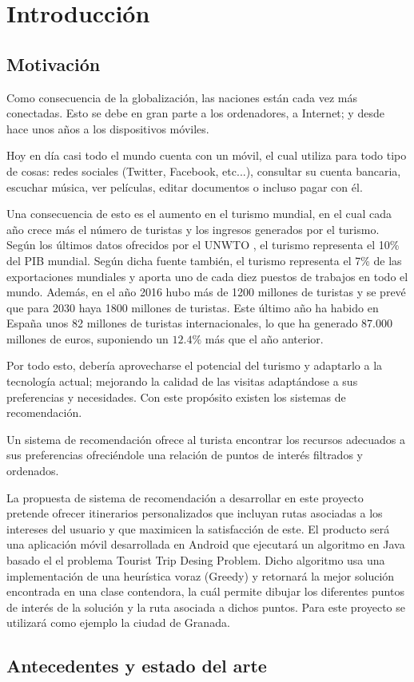 \chapter{Introducción}

\section[Motivación]{Motivación}
Como consecuencia de la globalización, las naciones están cada vez más conectadas. Esto se debe en gran parte a los ordenadores, a Internet; y desde hace unos años a los dispositivos móviles.\newline

Hoy en día casi todo el mundo cuenta con un móvil, el cual utiliza para todo tipo de cosas: redes sociales (Twitter, Facebook, etc...), consultar su cuenta bancaria, escuchar música, ver películas, editar documentos o incluso pagar con él.\newline

Una consecuencia de esto es el aumento en el turismo mundial, en el cual cada año crece más el número de turistas y los ingresos generados por el turismo. Según los últimos datos ofrecidos por el UNWTO \cite{unwto_resumen}, el turismo representa el 10\% del PIB mundial. Según dicha fuente también, el turismo representa el 7\% de las exportaciones mundiales y aporta uno de cada diez puestos de trabajos en todo el mundo. Además, en el año 2016 hubo más de 1200 millones de turistas y se prevé que para 2030 haya 1800 millones de turistas. Este último año ha habido en España unos 82 millones de turistas internacionales, lo que ha generado 87.000 millones de euros, suponiendo un $12.4\%$ más que el año anterior.\newline

Por todo esto, debería aprovecharse el potencial del turismo y adaptarlo a la tecnología actual; mejorando la calidad de las visitas adaptándose a sus preferencias y necesidades. Con este propósito existen los sistemas de recomendación.\newline

Un sistema de recomendación ofrece al turista encontrar los recursos adecuados a sus preferencias ofreciéndole una relación de puntos de interés filtrados y ordenados.\newline

La propuesta de sistema de recomendación a desarrollar en este proyecto pretende ofrecer itinerarios personalizados que incluyan rutas asociadas a los intereses del usuario y que maximicen la satisfacción de este. El producto será una aplicación móvil desarrollada en Android que ejecutará un algoritmo en Java basado el el problema Tourist Trip Desing Problem. Dicho algoritmo usa una implementación de una heurística voraz (Greedy) y retornará la mejor solución encontrada en una clase contendora, la cuál permite dibujar los diferentes puntos de interés de la solución y la ruta asociada a dichos puntos. Para este proyecto se utilizará como ejemplo la ciudad de Granada.
\section[Antecedentes y estado del arte]{Antecedentes y estado del arte}
	
	

